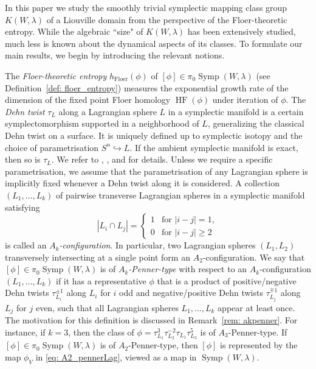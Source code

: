 \documentclass[12pt]{article}
\renewcommand{\ge}{\geqslant}
\theoremstyle{theorem}
\theoremstyle{definition}
\theoremstyle{remark}
\numberwithin{equation}{section}
\DeclareMathOperator{\floer}{Floer}
\DeclareMathOperator{\Symp}{Symp}
\DeclareMathOperator{\HF}{HF}
\begin{document}
In this paper we study the smoothly trivial symplectic mapping class group $K(W,\lambda)$ of a Liouville domain from the perspective of the Floer-theoretic entropy.
While the algebraic ``size" of $K(W,\lambda)$ has been extensively studied, much less is known about the dynamical aspects of its classes. %
To formulate our main results, we begin by introducing the relevant notions.

The \emph{Floer-theoretic entropy} $h_{\floer}(\phi)$ of $[\phi]\in\pi_0\Symp(W,\lambda)$ (see Definition~\ref{def: floer_entropy}) measures the exponential growth rate of the dimension of the fixed point Floer homology $\HF(\phi)$ under iteration of $\phi$.
The \emph{Dehn twist} $\tau_L$ along a Lagrangian sphere $L$ in a symplectic manifold is a certain symplectomorphism  supported in a neighborhood of $L$, generalizing the classical Dehn twist on a surface.
It is uniquely defined up to symplectic isotopy and the choice of parametrisation $S^n\hookrightarrow L$.
If the ambient symplectic manifold is exact, then so is $\tau_L$.
We refer to \cite[16a, 16c]{Se08b}, \cite[Section~6]{Se99}, and \cite[Section~3.4]{To15} for details.
Unless we require a specific parametrisation, we assume that the parametrisation of any Lagrangian sphere is implicitly fixed whenever a Dehn twist along it is considered.
A collection $(L_1,\dots,L_k)$ of pairwise transverse Lagrangian spheres in a symplectic manifold satisfying
$$
|L_i\cap L_j|=\begin{cases}
	1 & \text{for $|i-j|=1$}, \\
	0 & \text{for $|i-j|\ge 2$}
\end{cases} 
$$
is called an \emph{$A_k$-configuration}.
In particular, two Lagrangian spheres $(L_1,L_2)$ transversely intersecting at a single point form an $A_2$-configuration.
We say that $[\phi]\in \pi_0\Symp(W,\lambda)$ is of \emph{$A_k$-Penner-type} with respect to an $A_k$-configuration $(L_1,\dots,L_k)$ if it has a representative $\phi$ that is a product of positive/negative Dehn twists $\tau_{L_i}^{\pm1}$ along $L_i$ for $i$ odd and negative/positive Dehn twists $\tau_{L_j}^{\mp1}$ along $L_j$ for $j$ even, such that all Lagrangian spheres $L_1,\dots,L_k$ appear at least once.
The motivation for this definition is discussed in Remark~\ref{rem: akpenner}.
For instance, if $k=3$, then the class of $\phi=\tau_{L_1}^3\tau_{L_2}^{-2}\tau_{L_1}\tau_{L_3}^5$ is of $A_3$-Penner-type.
If $[\phi]\in\pi_0\Symp(W,\lambda)$ is of $A_2$-Penner-type, then $[\phi]$ is represented by the map $\phi_V$ in \eqref{eq: A2_pennerLag}, viewed as a map in $\Symp(W,\lambda)$.
\end{document}
